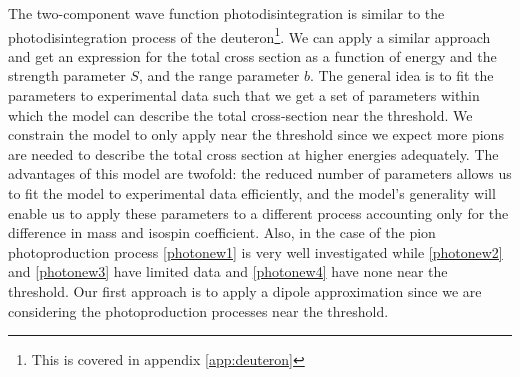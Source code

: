 The two-component wave function photodisintegration is similar to the photodisintegration process of the deuteron\footnote{This is covered in appendix \ref{app:deuteron}}. We can apply a similar approach and get an expression for the total cross section as a function of energy and the strength parameter $S$, and the range parameter $b$. The general idea is to fit the parameters to experimental data such that we get a set of parameters within which the model can describe the total cross-section near the threshold. We constrain the model to only apply near the threshold since we expect more pions are needed to describe the total cross section at higher energies adequately.
The advantages of this model are twofold: the reduced number of parameters allows us to fit the model to experimental data efficiently, and the model's generality will enable us to apply these parameters to a different process accounting only for the difference in mass and isospin coefficient. Also, in the case of the pion photoproduction process \eqref{photonew1} is very well investigated while \eqref{photonew2} and \eqref{photonew3} have limited data and \eqref{photonew4} have none near the threshold. Our first approach is to apply a dipole approximation since we are considering the photoproduction processes near the threshold. 

